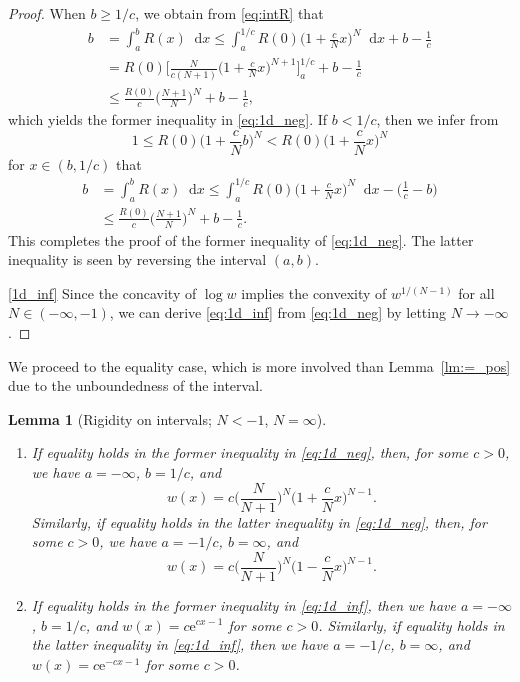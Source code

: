 \documentclass[sts]{imsart}
\newtheorem{lemma}[theorem]{Lemma}
\theoremstyle{definition}
\theoremstyle{remark}
\newcommand{\e}{\mathrm{e}}
\newcommand*\diff{\mathop{}\!\mathrm{d}}
\newcommand{\veb}[1]{\textcolor{blue}{\textbf{VEB:}  #1}}
\begin{document}
\begin{proof}
When $b \ge 1/c$, we obtain from \eqref{eq:intR} that
\begin{align}
b &= \int _a^b R(x)\diff x
 \le  \int_a^{1/c} R(0)\biggl( 1+\frac{c}{N}x \biggr)^N \diff x +b-\frac{1}{c} \label{eq:b_neg}\\
&= R(0) \Biggl[ \frac{N}{c(N+1)} \biggl( 1+\frac{c}{N}x \biggr)^{N+1} \Biggr]_a^{1/c} +b-\frac{1}{c} \nonumber\\
&\le \frac{R(0)}{c} \biggl(\frac{N+1}{N}\biggr)^N +b-\frac{1}{c}, \nonumber
\end{align}
which yields the former inequality in \eqref{eq:1d_neg}.
If $b<1/c$, then we infer from
\[ 
1 \le R(0) \biggl( 1+\frac{c}{N}b \biggr)^N < R(0) \biggl( 1+\frac{c}{N}x \biggr)^N
\]
for $x \in (b,1/c)$ that
\begin{align*}
b &= \int _a^b R(x)\diff x
 \le \int_a^{1/c} R(0)\biggl( 1+\frac{c}{N}x \biggr)^N \diff x - \biggl( \frac{1}{c} -b \biggr)\\
&\le \frac{R(0)}{c} \biggl(\frac{N+1}{N}\biggr)^N +b-\frac{1}{c}.
\end{align*}
This completes the proof of the former inequality of \eqref{eq:1d_neg}.
The latter inequality is seen by reversing the interval $(a,b)$.

\eqref{1d_inf}
Since the concavity of $\log w$ implies the convexity of $w^{1/(N-1)}$ for all $N \in (-\infty,-1)$, we can derive \eqref{eq:1d_inf} from \eqref{eq:1d_neg} by letting $N \to -\infty$.
\end{proof}

We proceed to the equality case, which is more involved than Lemma~\ref{lm:=_pos} due to the unboundedness of the interval.

\begin{lemma}[Rigidity on intervals; $N<-1$, $N=\infty$]\label{lm:=_inf}
\begin{enumerate}[{\rm (i)}]
\item\label{1d=_neg}
If equality holds in the former inequality in \eqref{eq:1d_neg},
then, for some $c>0$, we have $a=-\infty$, $b=1/c$, and
\begin{equation}\label{eq:=_inf}
w(x) =c \biggl( \frac{N}{N+1} \biggr)^N \biggl( 1+\frac{c}{N}x \biggr)^{N-1}.
\end{equation}
Similarly, if equality holds in the latter inequality in \eqref{eq:1d_neg},
then, for some $c>0$, we have $a=-1/c$, $b=\infty$, and
\[
w(x) =c \biggl( \frac{N}{N+1} \biggr)^N \biggl( 1-\frac{c}{N}x \biggr)^{N-1}.
\]

\item\label{1d=_inf}
If equality holds in the former inequality in \eqref{eq:1d_inf},
then we have $a=-\infty$, $b=1/c$, and $w(x)=c \e^{cx-1}$ for some $c>0$.
Similarly, if equality holds in the latter inequality in \eqref{eq:1d_inf},
then we have $a=-1/c$, $b=\infty$, and $w(x)=c \e^{-cx-1}$ for some $c>0$.
\end{enumerate}
\end{lemma}
\end{document}
